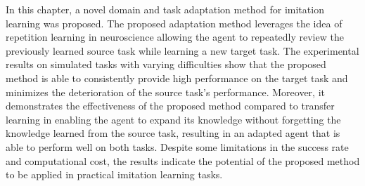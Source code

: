 In this chapter, a novel domain and task adaptation method for imitation learning was proposed.
The proposed adaptation method leverages the idea of repetition learning in neuroscience allowing the agent to repeatedly review the previously learned source task while learning a new target task.
The experimental results on simulated tasks with varying difficulties show that the proposed method is able to consistently provide high performance on the target task and minimizes the deterioration of the source task's performance.
Moreover,
it demonstrates the effectiveness of the proposed method compared to transfer learning in enabling the agent to expand its knowledge without forgetting the knowledge learned from the source task,
resulting in an adapted agent that is able to perform well on both tasks.
Despite some limitations in the success rate and computational cost,
the results indicate the potential of the proposed method to be applied in practical imitation learning tasks.
